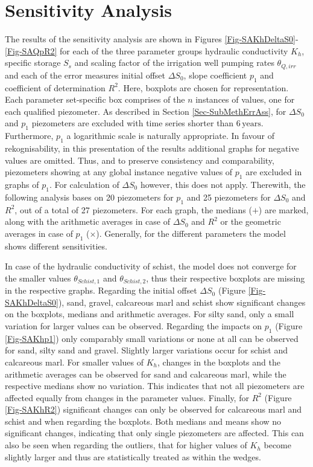 
\section{Sensitivity Analysis}

The results of the sensitivity analysis are shown in Figures \ref{Fig-SAKhDeltaS0}-\ref{Fig-SAQpR2} for each of the three parameter groups hydraulic conductivity $K_h$, specific storage $S_s$ and scaling factor of the irrigation well pumping rates $\theta_{Q,irr}$ and each of the error measures initial offset $\Delta S_0$, slope coefficient $p_1$ and coefficient of determination $R^2$. Here, boxplots are chosen for representation. Each parameter set-specific box comprises of the $n$ instances of values, one for each qualified piezometer. As described in Section \ref{Sec-SubMethErrAss}, for $\Delta S_0$ and $p_1$ piezometers are excluded with time series shorter than $6 \, \textrm{years}$. Furthermore, $p_1$ a logarithmic scale is naturally appropriate. In favour of rekognisability, in this presentation of the results additional graphs for negative values are omitted. Thus, and to preserve consistency and comparability, piezometers showing at any global instance negative values of $p_1$ are excluded in graphs of $p_1$. For calculation of $\Delta S_0$ however, this does not apply. Therewith, the following analysis bases on 20 piezometers for $p_1$ and 25 piezometers for $\Delta S_0$ and $R^2$, out of a total of 27 piezometers. For each graph, the medians ($\bm{+}$) are marked, along with the arithmetic averages in case of $\Delta S_0$ and $R^2$ or the geometric averages in case of $p_1$ ($\bm{\times}$). Generally, for the different parameters the model shows different sensitivities.

In case of the hydraulic conductivity of schist, the model does not converge for the smaller values $\theta_{Schist,1}$ and $\theta_{Schist,2}$, thus their respective boxplots are missing in the respective graphs. Regarding the initial offset $\Delta S_0$ (Figure \ref{Fig-SAKhDeltaS0}), sand, gravel, calcareous marl and schist show significant changes on the boxplots, medians and arithmetic averages. For silty sand, only a small variation for larger values can be observed. Regarding the impacts on $p_1$ (Figure \ref{Fig-SAKhp1}) only comparably small variations or none at all can be observed for sand, silty sand and gravel. Slightly larger variations occur for schist and calcareous marl. For smaller values of $K_h$, changes in the boxplots and the arithmetic averages can be observed for sand and calcareous marl, while the respective medians show no variation. This indicates that not all piezometers are affected equally from changes in the parameter values. Finally, for $R^2$ (Figure \ref{Fig-SAKhR2}) significant changes can only be observed for calcareous marl and schist and when regarding the boxplots. Both medians and means show no significant changes, indicating that only single piezometers are affected. This can also be seen when regarding the outliers, that for higher values of $K_h$ become slightly larger and thus are statistically treated as within the wedges.

